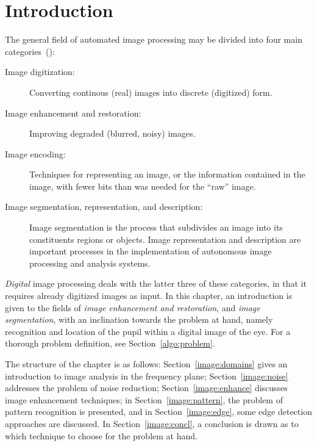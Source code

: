 
\section{Introduction}
\label{image:intro}

The general field of automated image processing may be divided into
four main categories~(\cite{digim}):

\begin{description}
\item[Image digitization:] Converting continous (real) images into
  discrete (digitized) form.
\item[Image enhancement and restoration:] Improving degraded (blurred,
  noisy) images.
\item[Image encoding:] Techniques for representing an image, or the
  information contained in the image, with fewer bits than was needed
  for the ``raw'' image.
\item[Image segmentation, representation, and description:] Image
  segmentation is the process that subdivides an image into its
  constituents regions or objects.  Image representation and
  description are important processes in the implementation of
  autonomous image processing and analysis systems.
\end{description}

{\em Digital\/} image processing deals with the latter three of these
categories, in that it requires already digitized images as input.  In
this chapter, an introduction is given to the fields of {\em image
  enhancement and restoration\/}, and {\em image segmentation\/}, with
an inclination towards the problem at hand, namely recognition and
location of the pupil within a digital image of the eye.  For a
thorough problem definition, see Section~\ref{algo:problem}.

The structure of the chapter is as follows:
Section~\ref{image:domains} gives an introduction to image analysis in
the frequency plane; Section~\ref{image:noise} addresses the problem
of noise reduction; Section~\ref{image:enhance} discusses image
enhancement techniques; in Section~\ref{image:pattern}, the problem of
pattern recognition is presented, and in Section~\ref{image:edge},
some edge detection approaches are discussed.  In
Section~\ref{image:concl}, a conclusion is drawn as to which technique
to choose for the problem at hand.
